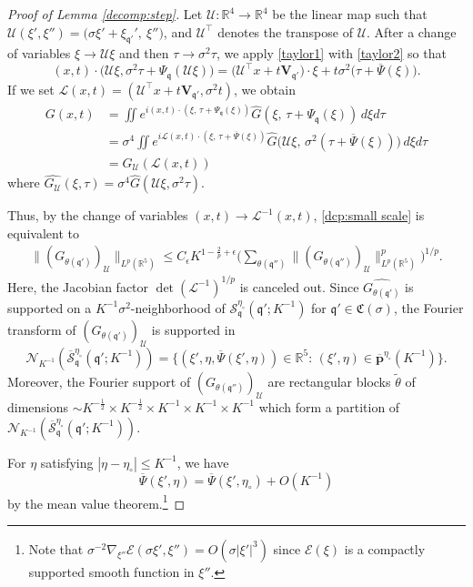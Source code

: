 \documentclass[10pt] %
{amsart}
\theoremstyle{plain}
\numberwithin{equation}{section}
\newcommand{\R}{\mathbb R}
\newcommand{\fq}{\mathfrak q}
\newcommand{\fm}{\mathfrak{q'}}
\newcommand{\fmm}{\mathfrak{q''}}
\begin{document}
\begin{proof}[Proof of Lemma \ref{decomp:step}]
Let $\mathcal U:\R^4\rightarrow\R^4$ be the linear map such that  $ \mathcal U(\xi',\xi'')=\big(\sigma\xi'+\xi_\fm',~\xi'')$,
and $\mathcal U^\intercal$ denotes the transpose of $\mathcal U$.
After a change of variables $\xi\rightarrow \mathcal U\xi$ and then $\tau\rightarrow \sigma^2\tau$, we apply \eqref{taylor1} with \eqref{taylor2} so that 
\[
(x,t)\cdot \big(\mathcal U\xi,\sigma^2\tau+\Psi_\fq(\mathcal U\xi)\big)
=\big(\mathcal U^{\intercal}x +t \mathbf V_\fm \big)\cdot \xi+ t\sigma^2\big(\tau+ \overline \Psi(\xi)\big).
\]
If we set $\mathcal L(x,t) = (\mathcal U^\intercal x+t\mathbf V_{\fm},\sigma^2t)$,
we obtain
\begin{align*}
G(x,t) 
&= \iint e^{i(x,t)\cdot (\xi,\, \tau+\Psi_\fq(\xi))} \widehat G(\xi,\, \tau+\Psi_\fq(\xi))
\,d\xi d\tau \\
&= \sigma^4 \iint e^{i \mathcal L (x,t)\cdot (\xi,\, \tau+\overline \Psi(\xi))}
\widehat G\big( \mathcal U \xi,\, \sigma^2(\tau+\overline \Psi(\xi))\big)
\,d\xi d\tau \\
& =  G_{\mathcal U}(\mathcal L(x,t))
\end{align*}
where $\widehat{G_{\mathcal U}}(\xi,\tau) = \sigma^4\widehat G(\mathcal U\xi,\sigma^2\tau)$.


Thus, by the change of variables $(x,t)\to \mathcal L^{-1}(x,t)$,
\eqref{dcp:small scale} is equivalent to 
\begin{align}\label{shifted dcp}
\big\| (G_{\theta(\fm)})_{\mathcal U} \big\|_{L^p(\mathbb R^5)} \le C_\epsilon K^{1-\frac2p+\epsilon} \Big( \sum_{\theta(\fmm)} \| (G_{\theta(\fmm)})_{\mathcal U}\|_{L^p(\mathbb R^5)}^p \Big)^{1/p}.
\end{align}
Here, the Jacobian factor $\det(\mathcal L^{-1})^{1/p}$ is canceled  out. 
Since $\widehat{G_{\theta(\fm)}}$ is supported on a $K^{-1}\sigma^2$-neighborhood of $\mathcal S_{\fq}^{\eta_\circ}(\fm;K^{-1})$ for $\fm \in \mathfrak C(\sigma)$,
the Fourier transform of $(G_{\theta(\fm)})_{\mathcal U }$ is supported in 
\[
\mathcal N_{K^{-1}}( \overline{\mathcal S}_{\fq} ^{\eta_\circ} (\fm;K^{-1}) ) =\Big\{ (\xi',\eta, \overline\Psi (\xi',\eta)) \in \R^5:\,  (\xi',\eta)\in \overline{\mathbf p}^{\eta_\circ}(K^{-1}) \Big\}.
\]
Moreover, the Fourier support of $(G_{\theta(\fmm)})_{\mathcal U}$ are rectangular blocks $\widetilde \theta$ of dimensions  $\sim K^{-\frac12}\times K^{-\frac12}\times K^{-1}\times K^{-1}\times K^{-1}$ which form a partition of $\mathcal N_{K^{-1}}( \overline{\mathcal S}_{\fq} ^{\eta_\circ} (\fm;K^{-1}) )$.

For $\eta$ satisfying $|\eta-\eta_\circ|\le K^{-1}$, we have 
\[
\overline \Psi(\xi',\eta) = \overline \Psi(\xi',\eta_\circ) + O(K^{-1})  \]
by the mean value theorem.\footnote{Note that $ \sigma^{-2}\nabla_{\xi''}\mathcal E(\sigma\xi',\xi'')=O( \sigma|\xi'|^3) $ since $ \mathcal E(\xi)$ is a compactly supported smooth function in $\xi''$.}
   

\end{proof}
\end{document}
